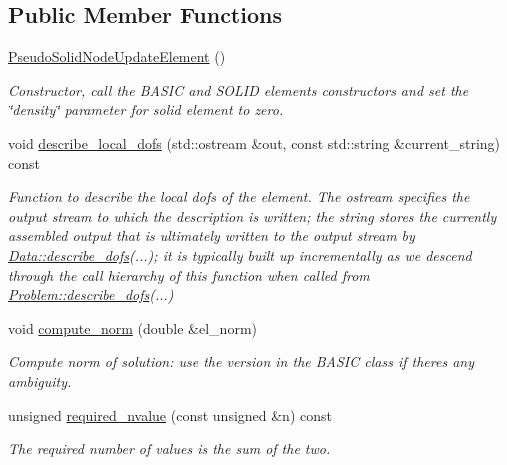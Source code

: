 \subsection*{Public Member Functions}
\begin{DoxyCompactItemize}
\item 
\hyperlink{classoomph_1_1PseudoSolidNodeUpdateElement_afd44332410c5956938614b5899f85cb8}{Pseudo\+Solid\+Node\+Update\+Element} ()
\begin{DoxyCompactList}\small\item\em Constructor, call the B\+A\+S\+IC and S\+O\+L\+ID elements\textquotesingle{} constructors and set the \char`\"{}density\char`\"{} parameter for solid element to zero. \end{DoxyCompactList}\item 
void \hyperlink{classoomph_1_1PseudoSolidNodeUpdateElement_a1736af22476b283ee75d4626ec1b0c7e}{describe\+\_\+local\+\_\+dofs} (std\+::ostream \&out, const std\+::string \&current\+\_\+string) const
\begin{DoxyCompactList}\small\item\em Function to describe the local dofs of the element. The ostream specifies the output stream to which the description is written; the string stores the currently assembled output that is ultimately written to the output stream by \hyperlink{classoomph_1_1Data_a2dae16e2dcff9a40029f834c83364df5}{Data\+::describe\+\_\+dofs}(...); it is typically built up incrementally as we descend through the call hierarchy of this function when called from \hyperlink{classoomph_1_1Problem_abc103804eb319ae0b3d43870cc3e1eaf}{Problem\+::describe\+\_\+dofs}(...) \end{DoxyCompactList}\item 
void \hyperlink{classoomph_1_1PseudoSolidNodeUpdateElement_a4db0954b3a48a6b1bb6df7a34d86b0e8}{compute\+\_\+norm} (double \&el\+\_\+norm)
\begin{DoxyCompactList}\small\item\em Compute norm of solution\+: use the version in the B\+A\+S\+IC class if there\textquotesingle{}s any ambiguity. \end{DoxyCompactList}\item 
unsigned \hyperlink{classoomph_1_1PseudoSolidNodeUpdateElement_a1d3ae58be7e3d2d9aa95086e631ce730}{required\+\_\+nvalue} (const unsigned \&n) const
\begin{DoxyCompactList}\small\item\em The required number of values is the sum of the two. \end{DoxyCompactList}\item 

\end{DoxyCompactItemize}

